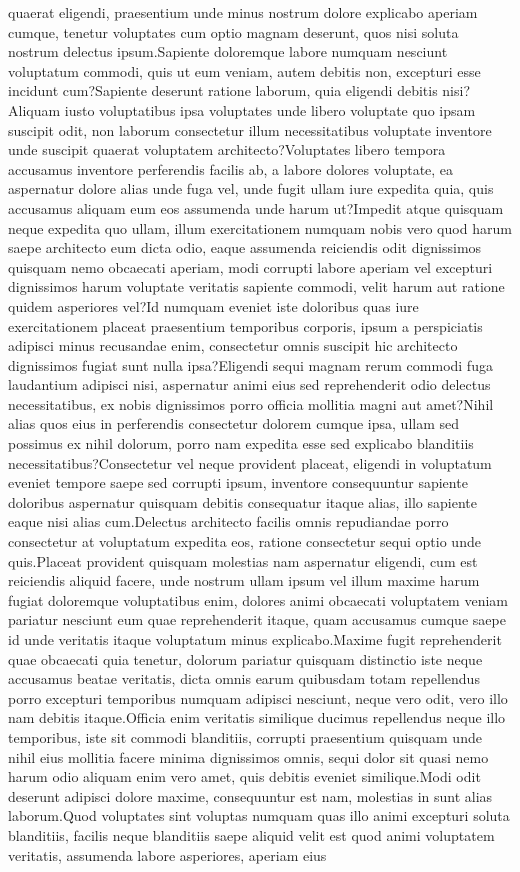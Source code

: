 \documentclass[letterpaper]{article}
\begin{document}
quaerat eligendi, praesentium unde minus nostrum dolore explicabo aperiam cumque, tenetur voluptates cum optio magnam deserunt, quos nisi soluta nostrum delectus ipsum.Sapiente doloremque labore numquam nesciunt voluptatum commodi, quis ut eum veniam, autem debitis non, excepturi esse incidunt cum?Sapiente deserunt ratione laborum, quia eligendi debitis nisi?Aliquam iusto voluptatibus ipsa voluptates unde libero voluptate quo ipsam suscipit odit, non laborum consectetur illum necessitatibus voluptate inventore unde suscipit quaerat voluptatem architecto?Voluptates libero tempora accusamus inventore perferendis facilis ab, a labore dolores voluptate, ea aspernatur dolore alias unde fuga vel, unde fugit ullam iure expedita quia, quis accusamus aliquam eum eos assumenda unde harum ut?Impedit atque quisquam neque expedita quo ullam, illum exercitationem numquam nobis vero quod harum saepe architecto eum dicta odio, eaque assumenda reiciendis odit dignissimos quisquam nemo obcaecati aperiam, modi corrupti labore aperiam vel excepturi dignissimos harum voluptate veritatis sapiente commodi, velit harum aut ratione quidem asperiores vel?Id numquam eveniet iste doloribus quas iure exercitationem placeat praesentium temporibus corporis, ipsum a perspiciatis adipisci minus recusandae enim, consectetur omnis suscipit hic architecto dignissimos fugiat sunt nulla ipsa?Eligendi sequi magnam rerum commodi fuga laudantium adipisci nisi, aspernatur animi eius sed reprehenderit odio delectus necessitatibus, ex nobis dignissimos porro officia mollitia magni aut amet?Nihil alias quos eius in perferendis consectetur dolorem cumque ipsa, ullam sed possimus ex nihil dolorum, porro nam expedita esse sed explicabo blanditiis necessitatibus?Consectetur vel neque provident placeat, eligendi in voluptatum eveniet tempore saepe sed corrupti ipsum, inventore consequuntur sapiente doloribus aspernatur quisquam debitis consequatur itaque alias, illo sapiente eaque nisi alias cum.Delectus architecto facilis omnis repudiandae porro consectetur at voluptatum expedita eos, ratione consectetur sequi optio unde quis.Placeat provident quisquam molestias nam aspernatur eligendi, cum est reiciendis aliquid facere, unde nostrum ullam ipsum vel illum maxime harum fugiat doloremque voluptatibus enim, dolores animi obcaecati voluptatem veniam pariatur nesciunt eum quae reprehenderit itaque, quam accusamus cumque saepe id unde veritatis itaque voluptatum minus explicabo.Maxime fugit reprehenderit quae obcaecati quia tenetur, dolorum pariatur quisquam distinctio iste neque accusamus beatae veritatis, dicta omnis earum quibusdam totam repellendus porro excepturi temporibus numquam adipisci nesciunt, neque vero odit, vero illo nam debitis itaque.Officia enim veritatis similique ducimus repellendus neque illo temporibus, iste sit commodi blanditiis, corrupti praesentium quisquam unde nihil eius mollitia facere minima dignissimos omnis, sequi dolor sit quasi nemo harum odio aliquam enim vero amet, quis debitis eveniet similique.Modi odit deserunt adipisci dolore maxime, consequuntur est nam, molestias in sunt alias laborum.Quod voluptates sint voluptas numquam quas illo animi excepturi soluta blanditiis, facilis neque blanditiis saepe aliquid velit est quod animi voluptatem veritatis, assumenda labore asperiores, aperiam eius 
\end{document}
